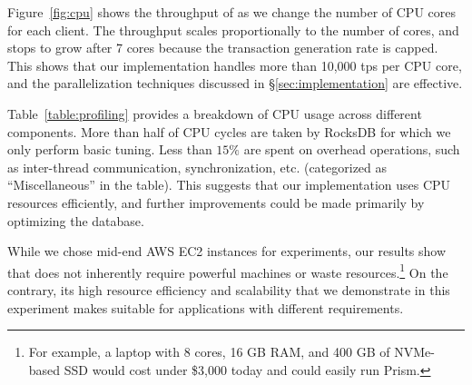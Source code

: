  Figure~\ref{fig:cpu} shows the throughput of \prism as we change the number of CPU cores for each client. The throughput scales proportionally to the number of cores, and stops to grow after 7 cores because the transaction generation rate is capped. This shows that our implementation handles more than 10,000 tps per CPU core, and the parallelization techniques discussed in \S\ref{sec:implementation} are effective. 

Table~\ref{table:profiling} provides a breakdown of CPU usage across different components. More than half of CPU cycles are taken by RocksDB for which we only perform basic tuning. Less than $15\%$ are spent on overhead operations, such as inter-thread communication, synchronization, etc. (categorized as ``Miscellaneous'' in the table). This suggests that our implementation uses CPU resources efficiently, and further improvements could be made primarily by optimizing the database. 

While we chose mid-end AWS EC2 instances for  experiments, our results show that  \prism  does not inherently require powerful machines or waste resources.\footnote{For example, a laptop with 8 cores, 16 GB RAM, and 400 GB of NVMe-based SSD would cost under \$3,000 today and could easily run Prism.} On the contrary, its high resource efficiency and scalability that we demonstrate in this experiment makes \prism suitable for applications with different requirements. 



